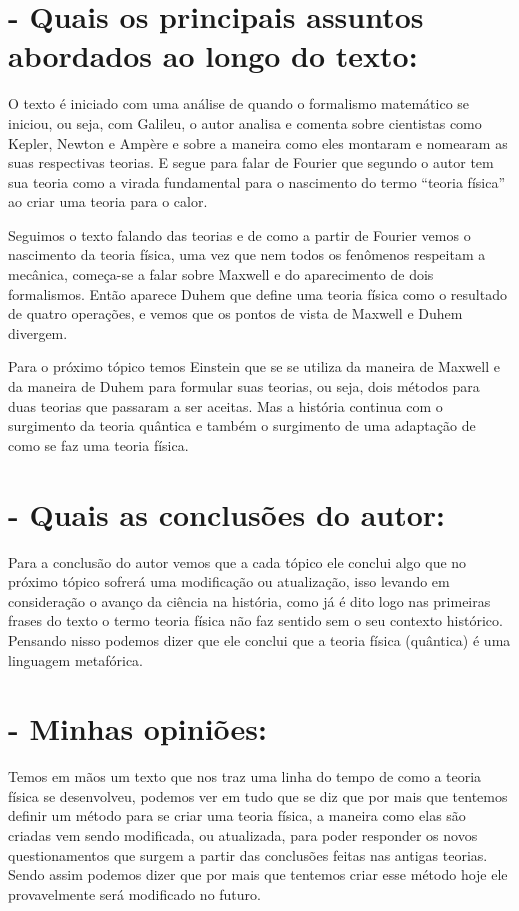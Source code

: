 \documentclass [a4paper, 12pt]{article}
\begin{document}
\section*{- Quais os principais assuntos abordados ao longo do texto:}

O texto é iniciado com uma análise de quando o formalismo matemático se iniciou, ou seja, com Galileu, o autor analisa e comenta sobre cientistas como Kepler, Newton e Ampère e sobre a maneira como eles montaram e nomearam as suas respectivas teorias. E segue para falar de Fourier que segundo o autor tem sua teoria como a virada fundamental para o nascimento do termo “teoria física” ao criar uma teoria para o calor.

Seguimos o texto falando das teorias e de como a partir de Fourier vemos o nascimento da teoria física, uma vez que nem todos os fenômenos respeitam a mecânica, começa-se a falar sobre Maxwell e do aparecimento de dois formalismos. Então aparece Duhem que define uma teoria física como o resultado de quatro operações, e vemos que os pontos de vista de Maxwell e Duhem divergem.

Para o próximo tópico temos Einstein que se se utiliza da maneira de Maxwell e da maneira de Duhem para formular suas teorias, ou seja, dois métodos para duas teorias que passaram a ser aceitas. Mas a história continua com o surgimento da teoria quântica e também o surgimento de uma adaptação de como se faz uma teoria física.


\section*{- Quais as conclusões do autor:}

Para a conclusão do autor vemos que a cada tópico ele conclui algo que no próximo tópico sofrerá uma modificação ou atualização, isso levando em consideração o avanço da ciência na história, como já é dito logo nas primeiras frases do texto o termo teoria física não faz sentido sem o seu contexto histórico. Pensando nisso podemos dizer que ele conclui que a teoria física (quântica) é uma linguagem metafórica.

\section*{- Minhas opiniões:}

Temos em mãos um texto que nos traz uma linha do tempo de como a teoria física se desenvolveu, podemos ver em tudo que se diz que por mais que tentemos definir um método para se criar uma teoria física, a maneira como elas são criadas vem sendo modificada, ou atualizada, para poder responder os novos questionamentos que surgem a partir das conclusões feitas nas antigas teorias. Sendo assim podemos dizer que por mais que tentemos criar esse método hoje ele provavelmente será modificado no futuro.
\end{document}
